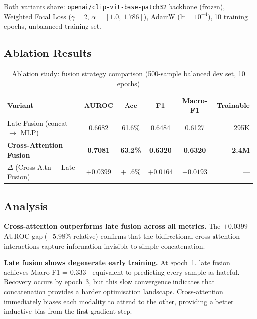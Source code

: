 \documentclass[12pt,a4paper]{article}
\begin{document}
Both variants share: \texttt{openai/clip-vit-base-patch32} backbone (frozen), Weighted Focal Loss ($\gamma=2$, $\alpha=[1.0,\ 1.786]$), AdamW ($\text{lr} = 10^{-4}$), 10 training epochs, unbalanced training set.

\subsection{Ablation Results}

\begin{table}[H]
  \centering
  \caption{Ablation study: fusion strategy comparison (500-sample balanced dev set, 10 epochs)}
  \renewcommand{\arraystretch}{1.35}
  \begin{tabular}{lccccr}
    \toprule
    \rowcolor{primaryblue!15}
    \textbf{Variant}                          & \textbf{AUROC} & \textbf{Acc} & \textbf{F1} & \textbf{Macro-F1} & \textbf{Trainable} \\
    \midrule
    Late Fusion (concat $\rightarrow$ MLP)    & 0.6682         & 61.6\%       & 0.6484      & 0.6127            & 295K \\
    \rowcolor{successgreen!15}
    \textbf{Cross-Attention Fusion}           & \textbf{0.7081}& \textbf{63.2\%} & \textbf{0.6320} & \textbf{0.6320} & \textbf{2.4M} \\
    \midrule
    \rowcolor{primaryblue!5}
    $\Delta$ (Cross-Attn $-$ Late Fusion)     & \textcolor{successgreen}{$+0.0399$} & \textcolor{successgreen}{$+1.6\%$} & \textcolor{successgreen}{$+0.0164$} & \textcolor{successgreen}{$+0.0193$} & --- \\
    \bottomrule
  \end{tabular}
  \label{tab:ablation}
\end{table}

\subsection{Analysis}

\textbf{Cross-attention outperforms late fusion across all metrics.} The $+0.0399$ AUROC gap ($+5.98\%$ relative) confirms that the bidirectional cross-attention interactions capture information invisible to simple concatenation.

\textbf{Late fusion shows degenerate early training.} At epoch~1, late fusion achieves Macro-F1 = 0.333---equivalent to predicting every sample as hateful. Recovery occurs by epoch~3, but this slow convergence indicates that concatenation provides a harder optimisation landscape. Cross-attention immediately biases each modality to attend to the other, providing a better inductive bias from the first gradient step.
\end{document}
